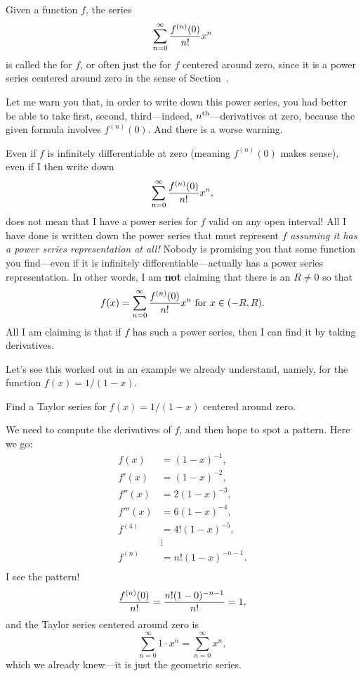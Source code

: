 \begin{definition}\label{defn:maclaurin-series}
Given a function $f$, the series
$$\sum_{n=0}^\infty {f^{(n)}(0)\over n!}x^n$$
is called the  for $f$, or often just the
 for $f$ centered around zero, since it is a
power series centered around zero in the sense of
Section~.
\end{definition}
Let me warn you that, in order to write down this power series, you
had better be able to take first, second, third---indeed,
$n^{\mbox{\scriptsize th}}$---derivatives at zero, because the given formula involves
$f^{(n)}(0)$.  And there is a worse warning.
\begin{warning}
  Even if $f$ is infinitely differentiable at zero (meaning $f^{(n)}(0)$ makes sense), even if I then write down
  $$
  \sum_{n=0}^\infty {f^{(n)}(0)\over n!}x^n,
  $$
  does not mean that I have a power series for $f$ valid on any open
  interval!  All I have done is written down the power series that
  must represent $f$ \textit{assuming it has a power series
    representation at all!}  Nobody is promising you that some
  function you find---even if it is infinitely
  differentiable---actually has a power series representation.  In
  other words, I am \textbf{not} claiming that there is an $R \neq 0$
  so that
  $$
  f(x) = \sum_{n=0}^\infty {f^{(n)}(0)\over n!}x^n \mbox{ for $x \in (-R,R)$}.
  $$
  All I am claiming is that if $f$ has such a power series, then I can
  find it by taking derivatives.
\end{warning}

Let's see this worked out in an example we already understand, namely,
for the function $f(x) = 1/(1-x)$.

\begin{example} Find a Taylor series for $f(x)=1/(1-x)$ centered
  around zero.
\end{example}

\begin{solution}
 We need to compute the derivatives of $f$, and then hope to
  spot a pattern.  Here we go:
\begin{align*}
  f(x)&=(1-x)^{-1}, \\
  f'(x)&=(1-x)^{-2}, \\
  f''(x)&=2(1-x)^{-3}, \\
  f'''(x)&=6(1-x)^{-4}, \\
  f^{(4)}&=4!(1-x)^{-5}, \\
  &\vdots \\
  f^{(n)}&=n!(1-x)^{-n-1}. \\
\end{align*}
I see the pattern!
$${f^{(n)}(0)\over n!}={n!(1-0)^{-n-1}\over n!}=1,$$
and the Taylor series centered around zero is
$$\sum_{n=0}^\infty 1\cdot x^n=\sum_{n=0}^\infty x^n,$$
which we already knew---it is just the geometric series.
\end{solution}

